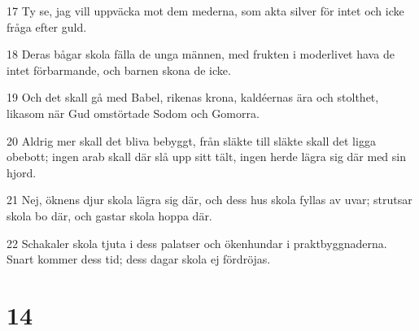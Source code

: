 \par 17 Ty se, jag vill uppväcka mot dem mederna, som akta silver för intet och icke fråga efter guld.
\par 18 Deras bågar skola fälla de unga männen, med frukten i moderlivet hava de intet förbarmande, och barnen skona de icke.
\par 19 Och det skall gå med Babel, rikenas krona, kaldéernas ära och stolthet, likasom när Gud omstörtade Sodom och Gomorra.
\par 20 Aldrig mer skall det bliva bebyggt, från släkte till släkte skall det ligga obebott; ingen arab skall där slå upp sitt tält, ingen herde lägra sig där med sin hjord.
\par 21 Nej, öknens djur skola lägra sig där, och dess hus skola fyllas av uvar; strutsar skola bo där, och gastar skola hoppa där.
\par 22 Schakaler skola tjuta i dess palatser och ökenhundar i praktbyggnaderna. Snart kommer dess tid; dess dagar skola ej fördröjas.

\chapter{14}

